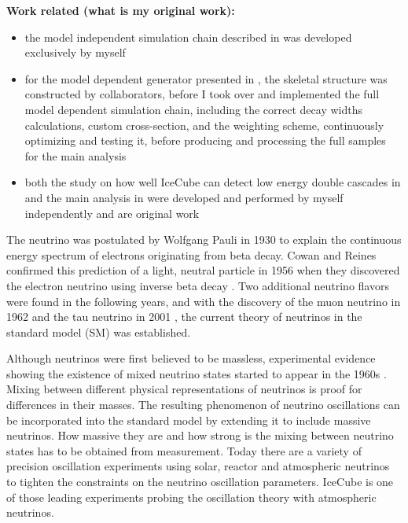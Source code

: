 \textbf{Work related (what is my original work):}
\begin{itemize}
    \item the model independent simulation chain described in  was developed exclusively by myself
    \item for the model dependent generator presented in , the skeletal structure was constructed by collaborators, before I took over and implemented the full model dependent simulation chain, including the correct decay widths calculations, custom cross-section, and the weighting scheme, continuously optimizing and testing it, before producing and processing the full samples for the main analysis
    \item both the study on how well IceCube can detect low energy double cascades in  and the main analysis in  were developed and performed by myself independently and are original work
\end{itemize}



The neutrino was postulated by Wolfgang Pauli  in 1930 to explain the continuous energy spectrum of electrons originating from beta decay.
Cowan and Reines confirmed this prediction of a light, neutral particle in 1956 when they discovered the electron neutrino using inverse beta decay .
Two additional neutrino flavors were found in the following years, and with the discovery of the muon neutrino in 1962  and the tau neutrino in 2001 , the current theory of neutrinos in the standard model (SM) was established.

Although neutrinos were first believed to be massless, experimental evidence showing the existence of mixed neutrino states started to appear in the 1960s .
Mixing between different physical representations of neutrinos is proof for differences in their masses.
The resulting phenomenon of neutrino oscillations can be incorporated into the standard model by extending it to include massive neutrinos.
How massive they are and how strong is the mixing between neutrino states has to be obtained from measurement.
Today there are a variety of precision oscillation experiments using solar, reactor and atmospheric neutrinos to tighten the constraints on the neutrino oscillation parameters.
IceCube is one of those leading experiments probing the oscillation theory with atmospheric neutrinos.

